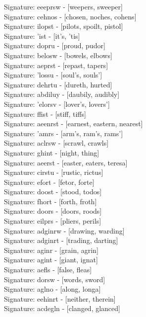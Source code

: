 Signature: {eeeprsw} - [weepers, sweeper] \\
Signature: {cehnos} - [chosen, noches, cohens] \\
Signature: {ilopst} - [pilots, spoilt, pistol] \\
Signature: {'ist} - [it's, 'tis] \\
Signature: {dopru} - [proud, pudor] \\
Signature: {belosw} - [bowels, elbows] \\
Signature: {aeprst} - [repast, tapers] \\
Signature: {'lossu} - [soul's, souls'] \\
Signature: {dehrtu} - [dureth, hurted] \\
Signature: {abdiluy} - [daubily, audibly] \\
Signature: {'elorsv} - [lover's, lovers'] \\
Signature: {ffist} - [stiff, tiffs] \\
Signature: {aeenrst} - [earnest, eastern, nearest] \\
Signature: {'amrs} - [arm's, ram's, rams'] \\
Signature: {aclrsw} - [scrawl, crawls] \\
Signature: {ghint} - [night, thing] \\
Signature: {aeerst} - [easter, eaters, teresa] \\
Signature: {cirstu} - [rustic, rictus] \\
Signature: {efort} - [fetor, forte] \\
Signature: {doost} - [stood, todos] \\
Signature: {fhort} - [forth, froth] \\
Signature: {doors} - [doors, roods] \\
Signature: {eilprs} - [pliers, perils] \\
Signature: {adginrw} - [drawing, warding] \\
Signature: {adginrt} - [trading, darting] \\
Signature: {aginr} - [grain, agrin] \\
Signature: {agint} - [giant, ignat] \\
Signature: {aefls} - [false, fleas] \\
Signature: {dorsw} - [words, sword] \\
Signature: {aglno} - [along, longa] \\
Signature: {eehinrt} - [neither, therein] \\
Signature: {acdegln} - [clanged, glanced] \\

